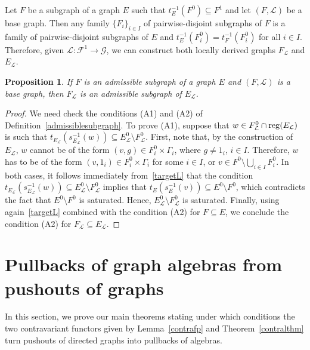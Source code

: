 \documentclass[12pt,times,a4paper]{amsart}
\newtheorem{proposition}[theorem]{Proposition}
\numberwithin{equation}{section}
\numberwithin{equation}{section}
\begin{document}
Let $F$ be a subgraph of a graph $E$ such that $t_E^{-1}(F^0)\subseteq F^1$ and let $(F,\mathcal{L})$ be a base graph. 
Then any family $\{F_i\}_{i\in I}$ of pairwise-disjoint subgraphs of $F$ is a family of 
pairwise-disjoint subgraphs of $E$ and $t^{-1}_E(F^0_i)=t_F^{-1}(F^0_i)$ for all $i\in I$.
Therefore, given $\mathcal{L}\colon\mathcal{F}^1\to\mathcal{G}$, we can construct both 
locally derived graphs $F_\mathcal{L}$ and $E_\mathcal{L}$.
\begin{proposition}\label{adml}
If $F$ is an admissible subgraph of a graph $E$ and $(F,\mathcal{L})$ is a base graph, then $F_\mathcal{L}$ is 
an admissible subgraph of $E_{\mathcal{L}}$.
\end{proposition}
\begin{proof}
We need check the conditions (A1) and (A2) of Definition~\ref{admissiblesubgraph}. 
To prove (A1), suppose that $w\in F^0_\mathcal{L}\cap {\rm reg}(E_\mathcal{L})$ is such that 
$t_{E_\mathcal{L}}(s_{E_\mathcal{L}}^{-1}(w))\subseteq E^0_{\mathcal{L}}\setminus F^0_{\mathcal{L}}$. 
First, note that, by the construction of $E_\mathcal{L}$, $w$ cannot be of the form $(v,g)\in F^0_i\times\Gamma_i$, where $g\neq 1_i$, $i\in I$. 
Therefore, $w$ has to be of the form $(v,1_i)\in F^0_i\times\Gamma_i$ for some $i\in I$, or $v\in F^0\setminus \bigcup_{i\in I}F^0_i$. 
In both cases, it follows immediately from~\eqref{targetL} that the condition 
$t_{E_\mathcal{L}}(s_{E_\mathcal{L}}^{-1}(w))\subseteq E^0_{\mathcal{L}}\setminus F^0_{\mathcal{L}}$ implies that 
$t_{E}(s_{E}^{-1}(v))\subseteq E^0\setminus F^0$, which contradicts the fact that $E^0\setminus F^0$ is saturated. 
Hence, $E^0_\mathcal{L}\setminus F^0_\mathcal{L}$ is saturated. 
Finally, using again~\eqref{targetL} combined with the condition (A2) for $F\subseteq E$, we conclude the condition (A2) for 
$F_\mathcal{L}\subseteq E_\mathcal{L}$.
\end{proof}

\section{Pullbacks of graph algebras from pushouts of graphs}
\noindent
In this section, we prove our main theorems stating under which conditions the two contravariant functors given by 
Lemma~\ref{contrafp} and Theorem~\ref{contralthm} turn
pushouts of directed graphs into pullbacks of algebras. 
\end{document}
